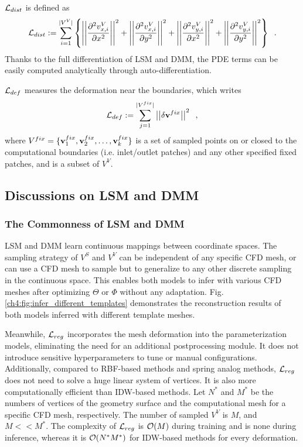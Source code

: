 $\mathcal{L}_{dist}$ is defined as
\begin{equation}
    \mathcal{L}_{dist} := \sum_{i=1}^{|V^V|} \left\{
    \left|\left| \frac{\partial^2 v^V_{x,i}}{\partial x^2} \right|\right|^2 + 
    \left|\left| \frac{\partial^2 v^V_{x,i}}{\partial y^2} \right|\right|^2 + 
    \left|\left| \frac{\partial^2 v^V_{y,i}}{\partial x^2} \right|\right|^2 + 
    \left|\left| \frac{\partial^2 v^V_{y,i}}{\partial y^2} \right|\right|^2
    \right\} \;\;.
\end{equation}
Thanks to the full differentiation of LSM and DMM, the PDE terms can be easily computed analytically through auto-differentiation.

$\mathcal{L}_{def}$ measures the deformation near the boundaries, which writes
\begin{equation}
    \mathcal{L}_{def} := \sum_{j=1}^{|V^{fix}|} \left|\left| \delta \mathbf{v}^{fix} \right|\right|^2 \;\;,
\end{equation}
where $V^{fix}=\{\mathbf{v}^{fix}_1,\mathbf{v}^{fix}_2,\ldots,\mathbf{v}^{fix}_k\}$ is a set of sampled points on or closed to the computational boundaries (i.e. inlet/outlet patches) and any other specified fixed patches, and is a subset of $V^V$.

\subsection{Discussions on LSM and DMM}
\label{ch4:sec:discussion_lsm_dmm}
\subsubsection{The Commonness of LSM and DMM}
LSM and DMM learn continuous mappings between coordinate spaces. The sampling strategy of $V^S$ and $V^V$ can be independent of any specific CFD mesh, or can use a CFD mesh to sample but to generalize to any other discrete sampling in the continuous space.
This enables both models to infer with various CFD meshes after optimizing $\Theta$ or $\Phi$ without any adaptation.
Fig.\ref{ch4:fig:infer_different_templates} demonstrates the reconstruction results of both models inferred with different template meshes.



Meanwhile, $\mathcal{L}_{reg}$ incorporates the mesh deformation into the parameterization models, eliminating the need for an additional postprocessing module. It does not introduce sensitive hyperparameters to tune or manual configurations. Additionally, compared to RBF-based methods and spring analog methods, $\mathcal{L}_{reg}$ does not need to solve a huge linear system of vertices. It is also more computationally efficient than IDW-based methods. Let $N^*$ and $M^*$ be the numbers of vertices of the geometry surface and the computational mesh for a specific CFD mesh, respectively. The number of sampled $V^V$ is $M$, and $M<<M^*$. The complexity of $\mathcal{L}_{reg}$ is $\mathcal{O}(M)$ during training and is none during inference, whereas it is $\mathcal{O}(N^*M^*)$ for IDW-based methods for every deformation.

